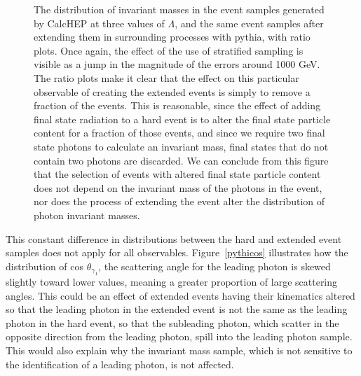 \begin{figure}[htp]
\centering
\begin{minipage}[b]{.69\textwidth}\hspace{-1.5em}\makebox[0pt][l]{
\noindent\begin{infilsf}
\tiny

\end{infilsf}}
\end{minipage}\hfill
\caption{The distribution of invariant masses in the event samples generated by CalcHEP at three values of $\Lambda$, and the same event samples after extending them in surrounding processes with pythia, with ratio plots. Once again, the effect of the use of stratified sampling is visible as a jump in the magnitude of the errors around 1000 GeV. The ratio plots make it clear that the effect on this particular observable of creating the extended events is simply to remove a fraction of the events. This is reasonable, since the effect of adding final state radiation to a hard event is to alter the final state particle content for a fraction of those events, and since we require two final state photons to calculate an invariant mass, final states that do not contain two photons are discarded. We can conclude from this figure that the selection of events with altered final state particle content does not depend on the invariant mass of the photons in the event, nor does the process of extending the event alter the distribution of photon invariant masses.
\label{pythify}}
\end{figure}

This constant difference in distributions between the hard and extended event samples does not apply for all observables. Figure~\ref{pythicos} illustrates how the distribution of cos $\theta_{\gamma_1}$, the scattering angle for the leading photon is skewed slightly toward lower values, meaning a greater proportion of large scattering angles. This could be an effect of extended events having their kinematics altered so that the leading photon in the extended event is not the same as the leading photon in the hard event, so that the subleading photon, which scatter in the opposite direction from the leading photon, spill into the leading photon sample. This would also explain why the invariant mass sample, which is not sensitive to the identification of a leading photon, is not affected.

